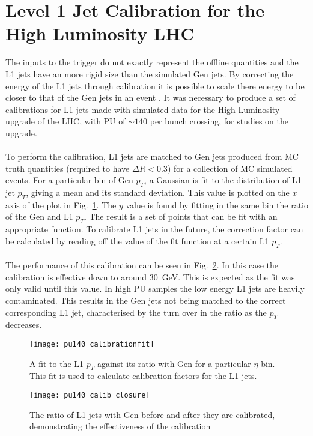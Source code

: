 \section{Level 1 Jet Calibration for the High Luminosity LHC}
\label{sec:pu140_calib}
The inputs to the trigger do not exactly represent the offline quantities and the L1 jets have an more rigid size than the simulated Gen jets. By correcting the energy of the L1 jets through calibration it is possible to scale there energy to be closer to that of the Gen jets in an event \cite{l1jet-calibration}. It was necessary to produce a set of calibrations for L1 jets made with simulated data for the High Luminosity upgrade of the LHC, with PU of $\sim140$ per bunch crossing, for studies on the upgrade.
\\\\
To perform the calibration, L1 jets are matched to Gen jets produced from MC truth quantities (required to have $\Delta R<0.3$) for a collection of MC simulated events. For a particular bin of Gen $p_T$, a Gaussian is fit to the distribution of L1 jet $p_T$, giving a mean and its standard deviation. This value is plotted on the $x$ axis of the plot in Fig.~\ref{fig:calibfit}. The $y$ value is found by fitting in the same bin the ratio of the Gen and L1 $p_T$. The result is a set of points that can be fit with an appropriate function. To calibrate L1 jets in the future, the correction factor can be calculated by reading off the value of the fit function at a certain L1 $p_T$. 
\\\\
The performance of this calibration can be seen in Fig.~\ref{fig:calibclosure}. In this case the calibration is effective down to around $30$~GeV. This is expected as the fit was only valid until this value. In high PU samples the low energy L1 jets are heavily contaminated. This results in the Gen jets not being matched to the correct corresponding L1 jet, characterised by the turn over in the ratio as the $p_T$ decreases.
\begin{figure}
	\begin{center}
		\texttt{[image: pu140\_calibrationfit]}
	\end{center}
	\caption{A fit to the L1 $p_T$ against its ratio with Gen for a particular $\eta$ bin. This fit is used to calculate calibration factors for the L1 jets.}
	\label{fig:calibfit}
\end{figure}
\begin{figure}
	\begin{center}
		\texttt{[image: pu140\_calib\_closure]}
	\end{center}
	\caption{The ratio of L1 jets with Gen before and after they are calibrated, demonstrating the effectiveness of the calibration \cite{nick-pu140calib}}
	\label{fig:calibclosure}
\end{figure}
